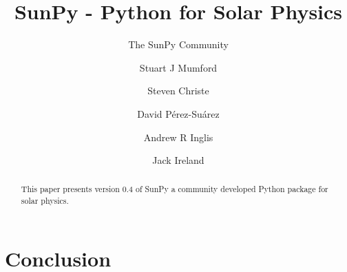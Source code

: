 \documentclass[12pt]{iopart}
\begin{document}
\title{SunPy - Python for Solar Physics}

\author{The SunPy Community}
\address{\url{http://sunpy.org}}

\author{Stuart J Mumford}
\address{Solar Physics \& Space Plasma Research Centre (SP$^{2}$RC), School of 
Mathematics and Statistics, The University of Sheffield, Hicks Building, 
Hounsfield Road, Sheffield, S3 7RH U.K.}

\author{Steven Christe}
\address{NASA Goddard Space Flight Center, Greenbelt, U.S.A.}

\author{David P\'erez-Su\'arez}
\address{South African National Space Agency - Space Science,
Hospital Street, 7200 Hermanus, Western Cape, South Africa}

\author{Andrew R Inglis}
\address{NASA Goddard Space Flight Center, Greenbelt, USA}
\address{The Catholic University of America, Washington, DC, USA}

\author{Jack Ireland}
\address{ADNET Systems Inc., Mail Code 671.1, NASA Goddard Space
  Flight Center, Greenbelt, MD, U.S.A.}

\begin{abstract}
This paper presents version 0.4 of SunPy a community developed Python package 
for solar physics.

\end{abstract}

\maketitle


\label{sec:Intro}


\label{sec:DataTypes}


\label{sec:retrevial}


\label{sec:util}


\label{sec:dev}


\label{sec:future}

\section{Conclusion}


{}
\end{document}
